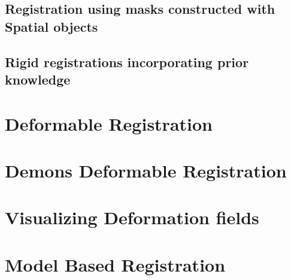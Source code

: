 \subsection{Registration using masks constructed with Spatial objects}
\label{sec:RegistrationSpatialObjects}




\subsection{Rigid registrations incorporating prior knowledge}
\label{sec:RegistrationCentered2DTransform}



\clearpage

\section{Deformable Registration}
\label{sec:DeformableRegistration}


\clearpage

\section{Demons Deformable Registration}
\label{sec:DemonsDeformableRegistration}


\section{Visualizing Deformation fields}
\label{sec:VisualizingDeformationFields}





\clearpage



\section{Model Based Registration}
\label{sec:ModelBasedRegistration}



